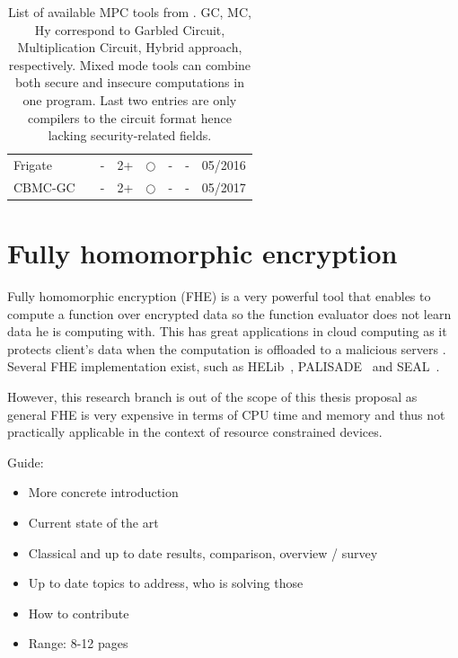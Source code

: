 \documentclass[
  digital, %
  twoside, %
  table,   %
  lof,     %
  lot,     %
]{fithesis3}
\theoremstyle{definition}
\theoremstyle{remark}
\begin{document}
\begin{table}[h]
\begin{tabular}{llllllll}
Frigate \cite{MGCBT16}    &  & -        & 2+ & $\Circle$     & -           & -         & 05/2016           \\
CBMC-GC \cite{HFKV12}    &  & -        & 2+ & $\Circle$     & -           & -         & 05/2017           \\
\end{tabular}
\caption{List of available MPC tools from \cite{sok19}. GC, MC, Hy correspond to Garbled Circuit, Multiplication Circuit, Hybrid approach, respectively. Mixed mode tools can combine both secure and insecure computations in one program. Last two entries are only compilers to the circuit format hence lacking security-related fields.}
\label{tbl:compilers}
\end{table}


\section{Fully homomorphic encryption}\label{sec:soa:fhe}
Fully homomorphic encryption (FHE) is a very powerful tool that enables to compute a function over encrypted data so the function evaluator does not learn data he is computing with. This has great applications in cloud computing as it protects client's data when the computation is offloaded to a malicious servers \cite{Gentry:2009:FHE:1536414.1536440, 10.1007/978-3-642-13190-5_2, cryptoeprint:2011:133, cryptoeprint:2012:099, 10.1007/978-3-642-40041-4_5, 10.1007/978-3-642-36362-7_1, 10.1007/978-3-642-55220-5_30}. 
Several FHE implementation exist, such as HELib~\cite{helib}, PALISADE~\cite{palisade} and SEAL~\cite{seal}.

However, this research branch is out of the scope of this thesis proposal as general FHE is very expensive in terms of CPU time and memory and thus not practically applicable in the context of resource constrained devices.


\newpage
\begin{shaded}
	Guide:
	\begin{itemize}
		\item More concrete introduction
		\item Current state of the art
		\item Classical and up to date results, comparison, overview / survey
		\item Up to date topics to address, who is solving those
		\item How to contribute
		\item Range: 8-12 pages
	\end{itemize}
\end{shaded}
\end{document}
